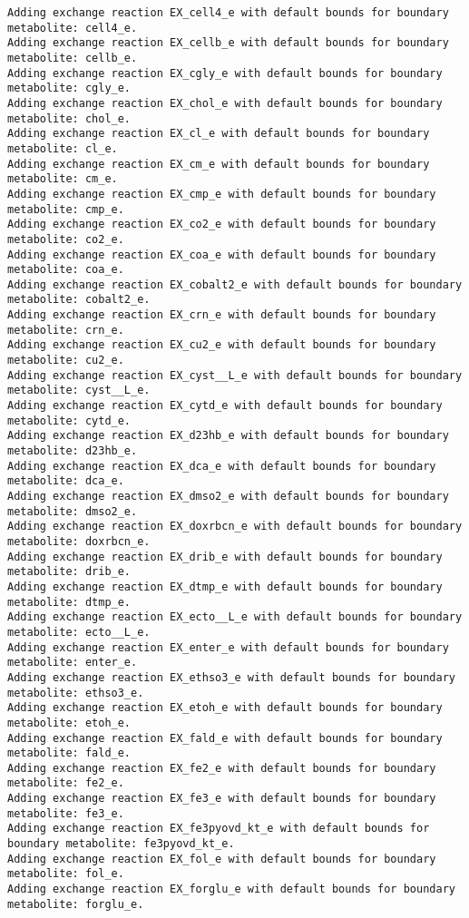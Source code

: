 \documentclass[
  letterpaper,
  DIV=11,
  numbers=noendperiod]{scrartcl}
\begin{document}
\begin{verbatim}
Adding exchange reaction EX_cell4_e with default bounds for boundary metabolite: cell4_e.
Adding exchange reaction EX_cellb_e with default bounds for boundary metabolite: cellb_e.
Adding exchange reaction EX_cgly_e with default bounds for boundary metabolite: cgly_e.
Adding exchange reaction EX_chol_e with default bounds for boundary metabolite: chol_e.
Adding exchange reaction EX_cl_e with default bounds for boundary metabolite: cl_e.
Adding exchange reaction EX_cm_e with default bounds for boundary metabolite: cm_e.
Adding exchange reaction EX_cmp_e with default bounds for boundary metabolite: cmp_e.
Adding exchange reaction EX_co2_e with default bounds for boundary metabolite: co2_e.
Adding exchange reaction EX_coa_e with default bounds for boundary metabolite: coa_e.
Adding exchange reaction EX_cobalt2_e with default bounds for boundary metabolite: cobalt2_e.
Adding exchange reaction EX_crn_e with default bounds for boundary metabolite: crn_e.
Adding exchange reaction EX_cu2_e with default bounds for boundary metabolite: cu2_e.
Adding exchange reaction EX_cyst__L_e with default bounds for boundary metabolite: cyst__L_e.
Adding exchange reaction EX_cytd_e with default bounds for boundary metabolite: cytd_e.
Adding exchange reaction EX_d23hb_e with default bounds for boundary metabolite: d23hb_e.
Adding exchange reaction EX_dca_e with default bounds for boundary metabolite: dca_e.
Adding exchange reaction EX_dmso2_e with default bounds for boundary metabolite: dmso2_e.
Adding exchange reaction EX_doxrbcn_e with default bounds for boundary metabolite: doxrbcn_e.
Adding exchange reaction EX_drib_e with default bounds for boundary metabolite: drib_e.
Adding exchange reaction EX_dtmp_e with default bounds for boundary metabolite: dtmp_e.
Adding exchange reaction EX_ecto__L_e with default bounds for boundary metabolite: ecto__L_e.
Adding exchange reaction EX_enter_e with default bounds for boundary metabolite: enter_e.
Adding exchange reaction EX_ethso3_e with default bounds for boundary metabolite: ethso3_e.
Adding exchange reaction EX_etoh_e with default bounds for boundary metabolite: etoh_e.
Adding exchange reaction EX_fald_e with default bounds for boundary metabolite: fald_e.
Adding exchange reaction EX_fe2_e with default bounds for boundary metabolite: fe2_e.
Adding exchange reaction EX_fe3_e with default bounds for boundary metabolite: fe3_e.
Adding exchange reaction EX_fe3pyovd_kt_e with default bounds for boundary metabolite: fe3pyovd_kt_e.
Adding exchange reaction EX_fol_e with default bounds for boundary metabolite: fol_e.
Adding exchange reaction EX_forglu_e with default bounds for boundary metabolite: forglu_e.

\end{verbatim}
\end{document}
